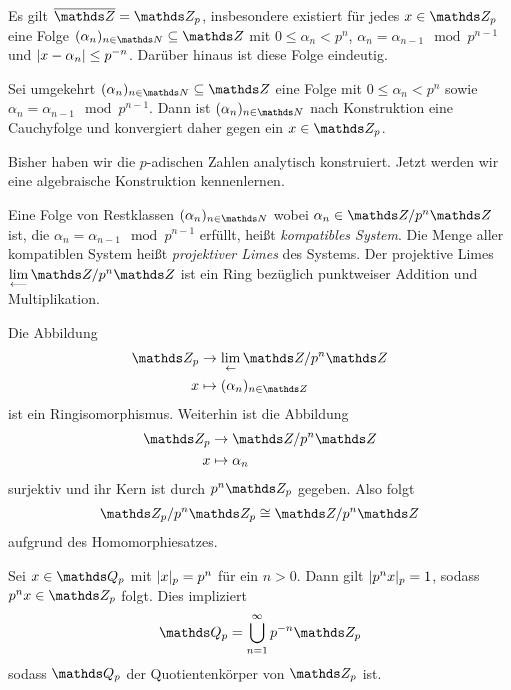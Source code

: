 \begin{cor}
Es gilt $\overline{\Z}=\Z_p$, insbesondere existiert für jedes $x \in \Z_p$ eine Folge
$(\alpha_n)_{n\in \N}\subseteq \Z$ mit $0 \leq \alpha_n<p^n$, $\alpha_n=\alpha_{n-1} \mod p^{n-1}$ und $|x-\alpha_n|\leq p^{-n}$.
Darüber hinaus ist diese Folge eindeutig.
\end{cor}

Sei umgekehrt $(\alpha_n)_{n \in \N}\subseteq \Z$ eine Folge mit $0\leq \alpha_n <p^n$ sowie $\alpha_n=\alpha_{n-1} \mod p^{n-1}$.
Dann ist $(\alpha_n)_{n\in \N}$ nach Konstruktion eine Cauchyfolge und konvergiert daher gegen ein $x\in \Z_p$.

Bisher haben wir die $p$-adischen Zahlen analytisch konstruiert.
Jetzt werden wir eine algebraische Konstruktion kennenlernen.

\begin{defi}
Eine Folge von Restklassen $(\alpha_n)_{n\in \N}$ wobei $\alpha_n \in \Z / p^n\Z$ ist, die $\alpha_n=\alpha_{n-1} \mod p^{n-1}$ erfüllt, heißt \emph{kompatibles System}.
Die Menge aller kompatiblen System heißt \emph{projektiver Limes} des Systems.
Der projektive Limes $\lim\limits_{\longleftarrow} \Z /p^n\Z$ ist ein Ring bezüglich punktweiser Addition und Multiplikation.
\end{defi}

\begin{thm}
Die Abbildung
\begin{align*}
\Z_p &\to \lim_{\leftarrow} \Z/p^n\Z\\
x &\mapsto (\alpha_n)_{n\in \Z}
\end{align*}
ist ein Ringisomorphismus.
Weiterhin ist die Abbildung
\begin{align*}
\Z_p &\to \Z /p^n \Z\\
x &\mapsto \alpha_n
\end{align*}
surjektiv und ihr Kern ist durch $p^n\Z_p$ gegeben.
Also folgt
\begin{align*}
\Z_p /p^n \Z_p \cong \Z /p^n \Z
\end{align*}
aufgrund des Homomorphiesatzes.
\end{thm}

\begin{lem}
Sei $x\in \Q_p$ mit $|x|_p=p^n$ für ein $n>0$.
Dann gilt $|p^n x|_p=1$, sodass $p^nx\in \Z_p$ folgt.
Dies impliziert
\begin{align*}
\Q_p=\bigcup_{n=1}^\infty p^{-n}\Z_p
\end{align*}
sodass $\Q_p$ der Quotientenkörper von $\Z_p$ ist.
\end{lem}


